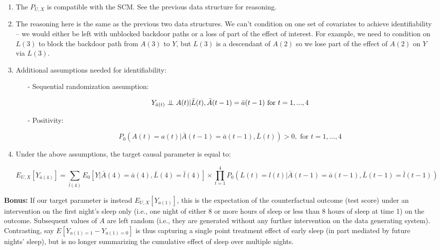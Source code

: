 \documentclass{exam}
\newcommand\independent{\protect\mathpalette{\protect\independenT}{\perp}}
\def\independenT#1#2{\mathrel{\setbox0\hbox{$#1#2$}%
    \copy0\kern-\wd0\mkern4mu\box0}}
\begin{document}
\begin{solution}

\begin{enumerate}

\item The $P_{U,X}$ is compatible with the SCM. See the previous data structure for reasoning.

\item The reasoning here is the same as the previous two data structures. We can't condition on one set of covariates to achieve identifiability -- we would either be left with unblocked backdoor paths or a loss of part of the effect of interest. For example, we need to condition on $L(3)$ to block the backdoor path from $A(3)$ to $Y$, but $L(3)$ is a descendant of $A(2)$ so we lose part of the effect of $A(2)$ on $Y$ via $L(3)$.

\item Additional assumptions needed for identifiability:

\begin{itemize}
\item[-] Sequential randomization assumption:

\[
Y_{\bar{a}(t)} \independent A(t) | \bar{L}(t), \bar{A}(t-1) = \bar{a}(t-1) \text{ for } t = 1, ..., 4 
\]

\item[-] Positivity:

\[
P_0(A(t) = a(t) | \bar{A}(t-1) = \bar{a}(t-1), \bar{L}(t)) > 0, \text{ for } t = 1,..., 4
\]

\end{itemize}

\item Under the above assumptions, the target causal parameter is equal to:

$$E_{U,X}[Y_{\bar{a}(4)}] = \sum_{\bar{l}(4)} E_0[Y|\bar{A}(4) = \bar{a}(4), \bar{L}(4) = \bar{l}(4)] \times \prod_{t = 1}^4 P_0(L(t) = l(t)|\bar{A}(t-1) = \bar{a}(t-1), \bar{L}(t-1) = \bar{l}(t-1))$$

\end{enumerate}

\noindent\textbf{Bonus:} If our target parameter is instead $E_{U,X}[Y_{a(1)}]$, this is the expectation of the counterfactual outcome (test score) under an intervention on the first night's sleep only (i.e., one night of either 8 or more hours of sleep or less than 8 hours of sleep at time 1) on the outcome. Subsequent values of $A$ are left random (i.e., they are generated without any further intervention on the data generating system). Contrasting, say $E[Y_{a(1) = 1} - Y_{a(1) = 0}]$ is thus capturing a single point treatment effect of early sleep (in part mediated by future nights' sleep), but is no longer summarizing the cumulative effect of sleep over multiple nights.


\end{solution}
\end{document}
